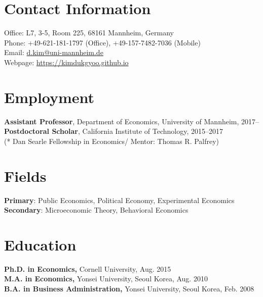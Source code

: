 \documentclass[margin, letterpaper]{res}
\begin{document}
 

\begin{resume} 
\section{Contact Information} Office: L7, 3-5, Room 225, 68161 Mannheim, Germany\\
Phone: +49-621-181-1797 (Office), +49-157-7482-7036 (Mobile)\\
Email: \href{mailto:d.kim@uni-mannheim.de}{d.kim@uni-mannheim.de}\\
Webpage: \url{https://kimdukgyoo.github.io}

\section{Employment}
\textbf{Assistant Professor}, Department of Economics, University of Mannheim, 2017--\\
\textbf{Postdoctoral Scholar}, California Institute of Technology, 2015--2017\\
(* Dan Searle Fellowship in Economics/ Mentor: Thomas R. Palfrey)

\section{Fields}
\textbf{Primary}: Public Economics, Political Economy, Experimental Economics\\
\textbf{Secondary}: Microeconomic Theory, Behavioral Economics

\section{Education} 
\textbf{Ph.D. in Economics,} Cornell University, Aug. 2015\\
\textbf{M.A. in Economics,} Yonsei University, Seoul Korea,  Aug. 2010\\
\textbf{B.A. in Business Administration,} Yonsei University, Seoul Korea, Feb. 2008


\end{resume}
\end{document}
